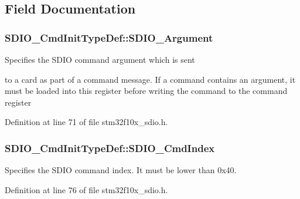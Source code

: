 \subsection{Field Documentation}
\hypertarget{struct_s_d_i_o___cmd_init_type_def_a37dfc4d7191ec10cffdb05ecf58d4807}{
\subsubsection[{S\-D\-I\-O\-\_\-\-Argument}]{ S\-D\-I\-O\-\_\-\-Cmd\-Init\-Type\-Def\-::\-S\-D\-I\-O\-\_\-\-Argument}}\label{struct_s_d_i_o___cmd_init_type_def_a37dfc4d7191ec10cffdb05ecf58d4807}
\begin{DoxyVerb}  Specifies the SDIO command argument which is sent
\end{DoxyVerb}
 to a card as part of a command message. If a command contains an argument, it must be loaded into this register before writing the command to the command register 

Definition at line 71 of file stm32f10x\-\_\-sdio.\-h.

\hypertarget{struct_s_d_i_o___cmd_init_type_def_ab5e1df1f0e8d48a308edfb59a6f80fb4}{
\subsubsection[{S\-D\-I\-O\-\_\-\-Cmd\-Index}]{ S\-D\-I\-O\-\_\-\-Cmd\-Init\-Type\-Def\-::\-S\-D\-I\-O\-\_\-\-Cmd\-Index}}\label{struct_s_d_i_o___cmd_init_type_def_ab5e1df1f0e8d48a308edfb59a6f80fb4}
Specifies the S\-D\-I\-O command index. It must be lower than 0x40. 

Definition at line 76 of file stm32f10x\-\_\-sdio.\-h.

